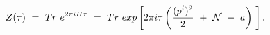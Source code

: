 \begin{equation}
Z(\tau) ~=~ Tr ~e^{2\pi i H \tau} ~=~ Tr ~exp\left[ 2\pi i \tau
\left( \frac{(p^i)^2}{2} ~+~ {\cal N} ~-~ a \right) ~\right].
\end{equation}

